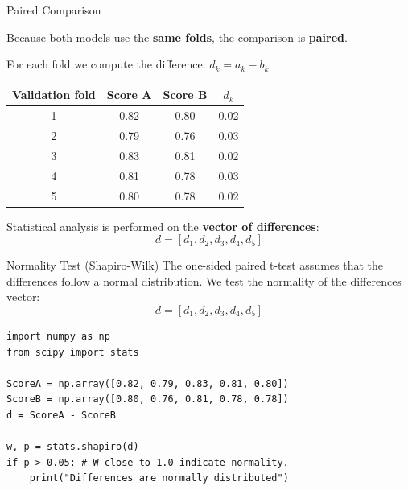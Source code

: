 \documentclass{beamer} %
\begin{document}
\begin{frame}{Paired Comparison}

Because both models use the \textbf{same folds}, the comparison is \textbf{paired}.

For each fold we compute the difference: $d_k = a_k - b_k$

\bigskip

\begin{center}
\begin{tabular}{c|c|c|c}
Validation fold & Score A & Score B & $d_k$ \\
\hline
1 & 0.82 & 0.80 & 0.02 \\
2 & 0.79 & 0.76 & 0.03 \\
3 & 0.83 & 0.81 & 0.02 \\
4 & 0.81 & 0.78 & 0.03 \\
5 & 0.80 & 0.78 & 0.02
\end{tabular}
\end{center}

\bigskip

Statistical analysis is performed on the \textbf{vector of differences}:
\[
d = [d_1, d_2, d_3, d_4, d_5]
\]

\end{frame}


\begin{frame}[fragile]{Normality Test (Shapiro-Wilk)}
The one-sided paired t-test assumes that the differences follow a normal distribution.
We test the normality of the differences vector:
\[
d = [d_1, d_2, d_3, d_4, d_5]
\]

\begin{lstlisting}
import numpy as np
from scipy import stats

ScoreA = np.array([0.82, 0.79, 0.83, 0.81, 0.80])
ScoreB = np.array([0.80, 0.76, 0.81, 0.78, 0.78])
d = ScoreA - ScoreB

w, p = stats.shapiro(d)
if p > 0.05: # W close to 1.0 indicate normality.
    print("Differences are normally distributed")
\end{lstlisting}
\end{frame}

\end{document}
